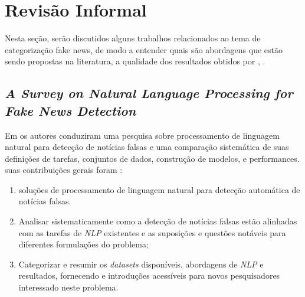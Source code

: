 \section{Revisão Informal}

Nesta seção, serão discutidos alguns trabalhos relacionados ao tema de
categorização fake news, de modo a entender quais são abordagens que estão sendo
propostas na literatura, a qualidade dos resultados obtidos por , .

\subsection{\textit{A Survey on Natural Language Processing for Fake News Detection}}

Em \cite{oshikawa2020} os autores conduziram uma pesquisa sobre processamento de linguagem natural para detecção de notícias falsas  e uma comparação sistemática de suas definições de tarefas, conjuntos de dados, construção de modelos, e performances.  suas contribuições gerais foram : 

\begin{enumerate}
    \item {} soluções de processamento de linguagem natural para detecção automática de notícias falsas.
    
    \item Analisar sistematicamente como a detecção de notícias falsas estão alinhadas com as tarefas de \textit{NLP} existentes e  as suposições e questões notáveis para diferentes formulações do problema;
    
    \item Categorizar e resumir os \textit{datasets} disponíveis, abordagens de \textit{NLP} e resultados, fornecendo  e introduções acessíveis para novos pesquisadores interessado neste problema.
\end{enumerate}

